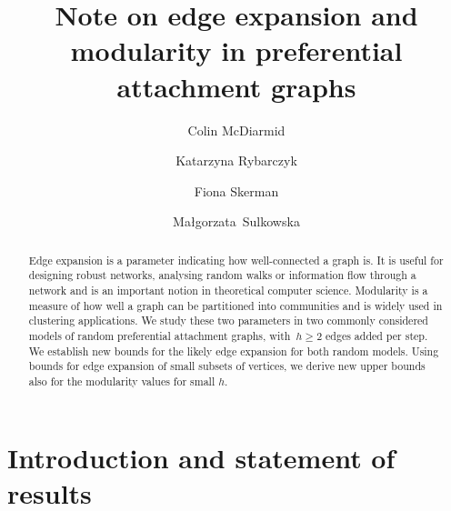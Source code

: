 \documentclass[runningheads, envcountsame, smallextended]{llncs}
\numberwithin{theorem}{section}
\numberwithin{definition}{section}
\numberwithin{lemma}{section}
\numberwithin{corollary}{section}
\numberwithin{proposition}{section}
\numberwithin{conjecture}{section}
\numberwithin{remark}{section}
\numberwithin{equation}{section}
\begin{document}
%
\title{Note on edge expansion and modularity in preferential attachment graphs}
%
%
\author{Colin McDiarmid \and
Katarzyna Rybarczyk \and
Fiona Skerman \and Ma\l gorzata~Sulkowska}
%
%
%
%
\maketitle              
%
\begin{abstract}
	Edge expansion is a parameter indicating how well-connected a graph is. It is useful for designing robust networks, analysing random walks or information flow through a network and is an important notion in theoretical computer science.   
    Modularity is a measure of how well a graph can be partitioned into communities and is widely used in clustering applications. We study these two parameters in two commonly considered models of random preferential attachment graphs, with~$h\geq 2$ edges added per step. 
    We establish new bounds for the likely edge expansion for both random models. 
    Using bounds for edge expansion of small subsets of vertices, we derive new upper bounds also for the modularity values for small $h$.

\end{abstract}
%
%
%
\section{Introduction and statement of results}  
\end{document}
